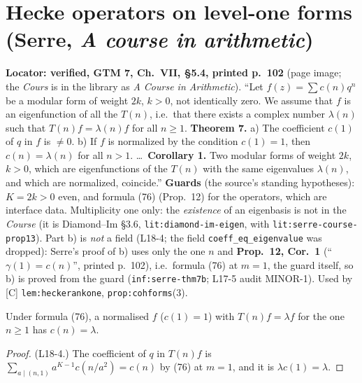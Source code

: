 \section{Hecke operators on level-one forms (Serre, \emph{A course in arithmetic})}

\begin{hypothesis}\label{lit:serre-course-thm7}
   \leanok
  \textbf{Locator: verified, GTM 7, Ch.~VII, \S5.4, printed p.~102} (page image; the \emph{Cours} is in the library
  as \emph{A Course in Arithmetic}). ``Let $f(z)=\sum c(n)q^n$ be a modular form of weight $2k$, $k>0$, not identically
  zero. We assume that $f$ is an eigenfunction of all the $T(n)$, i.e.\ that there exists a complex number $\lambda(n)$
  such that $T(n)f=\lambda(n)f$ for all $n\ge1$. \textbf{Theorem 7.} a) The coefficient $c(1)$ of $q$ in $f$ is $\ne0$.
  b) If $f$ is normalized by the condition $c(1)=1$, then $c(n)=\lambda(n)$ for all $n>1$. \dots\ \textbf{Corollary 1.}
  Two modular forms of weight $2k$, $k>0$, which are eigenfunctions of the $T(n)$ with the same eigenvalues
  $\lambda(n)$, and which are normalized, coincide.''
  \textbf{Guards} (the source's standing hypotheses): $K=2k>0$ even, and formula (76) (Prop.~12) for the operators,
  which are interface data. Multiplicity one only: the \emph{existence} of an eigenbasis is not in the \emph{Course}
  (it is Diamond--Im \S3.6, \texttt{lit:diamond-im-eigen}, with \texttt{lit:serre-course-prop13}).
  Part b) is \emph{not} a field (L18-4; the field \texttt{coeff\_eq\_eigenvalue} was dropped): Serre's proof of b) uses only
  the one $n$ and \textbf{Prop.~12, Cor.~1} (``$\gamma(1)=c(n)$'', printed p.~102), i.e.\ formula (76) at $m=1$, the guard
  itself, so b) is proved from the guard (\texttt{inf:serre-thm7b}; L17-5 audit MINOR-1).
  Used by [C] \texttt{lem:heckerankone}, \texttt{prop:cohforms}(3).
\end{hypothesis}

\begin{lemma}\label{inf:serre-thm7b}
  \leanok
  Under formula (76), a normalised $f$ ($c(1)=1$) with $T(n)f=\lambda f$ for the one $n\ge1$ has $c(n)=\lambda$.
\end{lemma}
\begin{proof}
  \leanok
  (L18-4.) The coefficient of $q$ in $T(n)f$ is $\sum_{a\mid(n,1)}a^{K-1}c(n/a^2)=c(n)$ by (76) at $m=1$, and it is
  $\lambda c(1)=\lambda$.
\end{proof}

